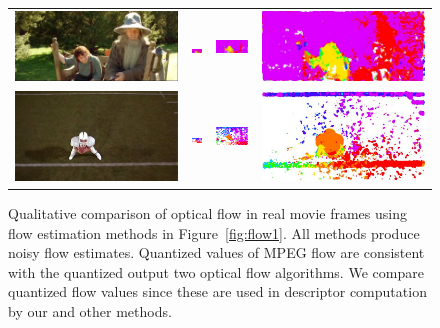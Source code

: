 \documentclass[10pt,twocolumn,letterpaper]{article}
\begin{document}
\begin{figure}[t!]
\begin{center}
\begin{tabular}{cccc}
\includegraphics[width=.23\textwidth]{figures/flow/flow_actioncliptest00538_frame014.jpeg} & 
\includegraphics[width=.23\textwidth]{figures/flow/flow_actioncliptest00538_frame014_mv_quant.png} & 
\includegraphics[width=.23\textwidth]{figures/flow/flow_actioncliptest00538_frame014_stip_quant.png} & 
\includegraphics[width=.23\textwidth]{figures/flow/flow_actioncliptest00538_frame014_traj_quant.jpeg} \\
\includegraphics[width=.23\textwidth]{figures/flow/flow_actioncliptest00870_frame013.jpeg} & 
\includegraphics[width=.23\textwidth]{figures/flow/flow_actioncliptest00870_frame014_mv_quant.png} & 
\includegraphics[width=.23\textwidth]{figures/flow/flow_actioncliptest00870_frame013_stip_quant.png} & 
\includegraphics[width=.23\textwidth]{figures/flow/flow_actioncliptest00870_frame013_traj_quant.jpeg} \vspace{.2cm}\\
\end{tabular}
\caption{Qualitative comparison of optical flow in real movie frames using flow estimation methods in Figure~\ref{fig:flow1}. All methods produce noisy flow estimates. Quantized values of MPEG flow are consistent with the quantized output two optical flow algorithms. We compare quantized flow values since these are used in descriptor computation by our and other methods.\vspace{-.6cm}}
\label{fig:flow2}
\end{center}
\end{figure}
\end{document}
